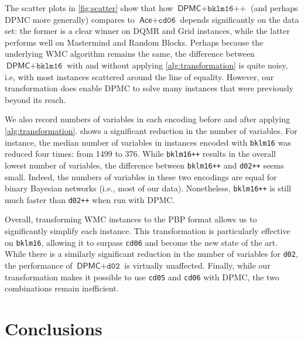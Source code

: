 \documentclass[runningheads]{llncs}
\begin{document}
The scatter plots in \cref{fig:scatter} show that how $\textsf{DPMC} +
\texttt{bklm16++}$ (and perhaps \textsf{DPMC} more generally) compares to
$\textsf{Ace} + \texttt{cd06}$ depends significantly on the data set: the former
is a clear winner on DQMR and Grid instances, while the latter performs well on
Mastermind and Random Blocks. Perhaps because the underlying WMC algorithm
remains the same, the difference between $\textsf{DPMC} + \texttt{bklm16}$ with
and without applying \cref{alg:transformation} is quite noisy, i.e, with most
instances scattered around the line of equality. However, our transformation
does enable \textsf{DPMC} to solve many instances that were previously beyond
its reach.

We also record numbers of variables in each encoding before and after applying
\cref{alg:transformation}.  shows a significant reduction in the
number of variables. For instance, the median number of variables in instances
encoded with \texttt{bklm16} was reduced four times: from 1499 to 376. While
\texttt{bklm16++} results in the overall lowest number of variables, the
difference between \texttt{bklm16++} and \texttt{d02++} seems small. Indeed, the
numbers of variables in these two encodings are equal for binary Bayesian
networks (i.e., most of our data). Nonetheless, \texttt{bklm16++} is still much
faster than \texttt{d02++} when run with \textsf{DPMC}.

Overall, transforming WMC instances to the PBP format allows us to significantly
simplify each instance. This transformation is particularly effective on
\texttt{bklm16}, allowing it to surpass \texttt{cd06} and become the new state
of the art. While there is a similarly significant reduction in the number of
variables for \texttt{d02}, the performance of $\textsf{DPMC}+\texttt{d02}$ is
virtually unaffected. Finally, while our transformation makes it possible to use
\texttt{cd05} and \texttt{cd06} with \textsf{DPMC}, the two combinations remain
inefficient.

\section{Conclusions}
\end{document}
